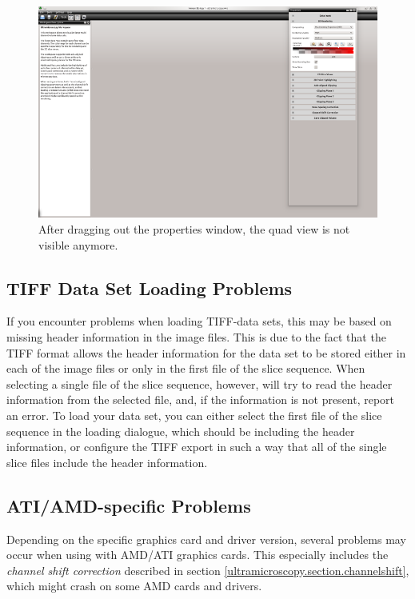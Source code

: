 \begin{figure}[htb]
 \centering
 \includegraphics[scale=0.5,keepaspectratio=true]{./images/disappearing_quadview.png}
 \caption{After dragging out the properties window, the quad view is not visible anymore.}
 \label{fig:disappearing_quadview}
\end{figure}


\subsection{TIFF Data Set Loading Problems}

If you encounter problems when loading TIFF-data sets, this may be based on missing header information in the image files. This is due to the fact that 
the TIFF format allows the header information for the data set to be stored either in each of the image files or only in the first file of the slice sequence.
When selecting a single file of the slice sequence, however, \Voreen will try to read the header information from the selected file, and, if the information 
is not present, report an error. To load your data set, you can either select the first file of the slice sequence in the loading dialogue, which should 
be including the header information, or configure the TIFF export in such a way that all of the single slice files include the header information.

\subsection{ATI/AMD-specific Problems}

Depending on the specific graphics card and driver version, several problems may occur when using \Voreen with AMD/ATI graphics cards.
This especially includes the \emph{channel shift correction} described in section \ref{ultramicroscopy.section.channelshift}, which might
crash on some AMD cards and drivers.